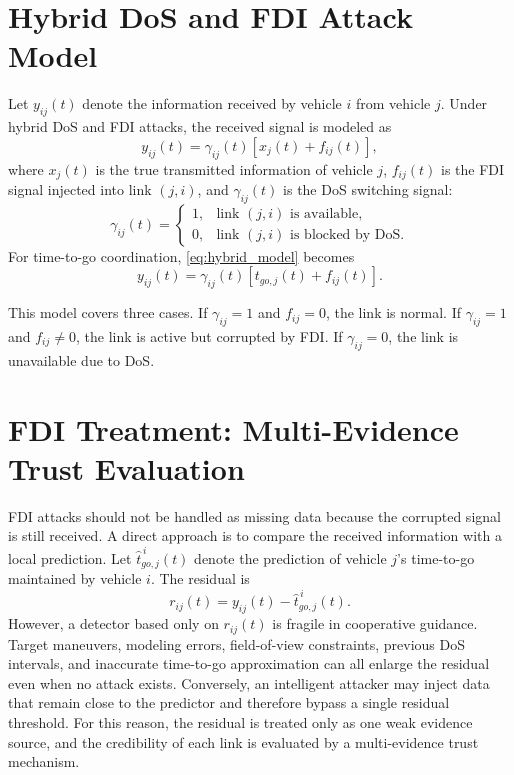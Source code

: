 \documentclass[lettersize,journal]{IEEEtran}
\begin{document}
\section{Hybrid DoS and FDI Attack Model}

Let $y_{ij}(t)$ denote the information received by vehicle $i$ from vehicle $j$. Under hybrid DoS and FDI attacks, the received signal is modeled as
\begin{equation}
    y_{ij}(t)
    =
    \gamma_{ij}(t)\left[x_j(t)+f_{ij}(t)\right],
    \label{eq:hybrid_model}
\end{equation}
where $x_j(t)$ is the true transmitted information of vehicle $j$, $f_{ij}(t)$ is the FDI signal injected into link $(j,i)$, and $\gamma_{ij}(t)$ is the DoS switching signal:
\begin{equation}
    \gamma_{ij}(t)=
    \begin{cases}
        1, & \text{link }(j,i)\text{ is available},\\
        0, & \text{link }(j,i)\text{ is blocked by DoS}.
    \end{cases}
    \label{eq:dos_switch}
\end{equation}
For time-to-go coordination, \eqref{eq:hybrid_model} becomes
\begin{equation}
    y_{ij}(t)
    =
    \gamma_{ij}(t)
    \left[t_{go,j}(t)+f_{ij}(t)\right].
    \label{eq:tgo_attack}
\end{equation}

This model covers three cases. If $\gamma_{ij}=1$ and $f_{ij}=0$, the link is normal. If $\gamma_{ij}=1$ and $f_{ij}\ne0$, the link is active but corrupted by FDI. If $\gamma_{ij}=0$, the link is unavailable due to DoS.

\section{FDI Treatment: Multi-Evidence Trust Evaluation}

FDI attacks should not be handled as missing data because the corrupted signal is still received. A direct approach is to compare the received information with a local prediction. Let $\hat t_{go,j}^{\,i}(t)$ denote the prediction of vehicle $j$'s time-to-go maintained by vehicle $i$. The residual is
\begin{equation}
    r_{ij}(t)=y_{ij}(t)-\hat t_{go,j}^{\,i}(t).
    \label{eq:residual}
\end{equation}
However, a detector based only on $r_{ij}(t)$ is fragile in cooperative guidance. Target maneuvers, modeling errors, field-of-view constraints, previous DoS intervals, and inaccurate time-to-go approximation can all enlarge the residual even when no attack exists. Conversely, an intelligent attacker may inject data that remain close to the predictor and therefore bypass a single residual threshold. For this reason, the residual is treated only as one weak evidence source, and the credibility of each link is evaluated by a multi-evidence trust mechanism.
\end{document}

